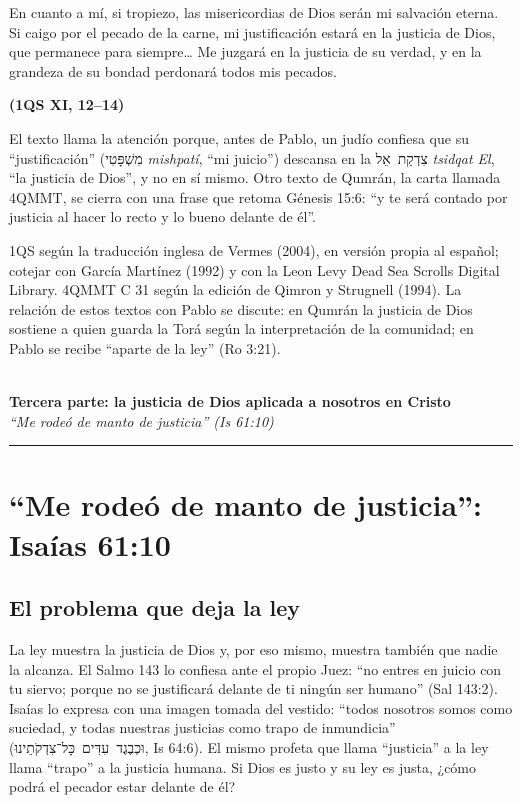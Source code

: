 \documentclass[11pt,letterpaper]{article}
\newcommand{\heb}[1]{\mbox{\foreignlanguage{hebrew}{#1}}}
\newcommand{\fuente}[1]{\par\hfill{\upshape\bfseries\small\textcolor{azul}{#1}}}
\begin{document}
\begin{cita}En cuanto a mí, si tropiezo, las misericordias de Dios serán mi salvación eterna. Si caigo por el pecado de la carne, mi justificación estará en la justicia de Dios, que permanece para siempre\ldots{} Me juzgará en la justicia de su verdad, y en la grandeza de su bondad perdonará todos mis pecados.\fuente{(1QS XI, 12--14)}\end{cita}

El texto llama la atención porque, antes de Pablo, un judío confiesa que su ``justificación'' (\heb{מִשְׁפָּטִי} \emph{mishpatí}, ``mi juicio'') descansa en la \heb{צִדְקַת אֵל} \emph{tsidqat El}, ``la justicia de Dios'', y no en sí mismo. Otro texto de Qumrán, la carta llamada 4QMMT, se cierra con una frase que retoma Génesis 15:6: ``y te será contado por justicia al hacer lo recto y lo bueno delante de él''.

\begin{nota}[Precisión]
1QS según la traducción inglesa de Vermes (2004), en versión propia al español; cotejar con García Martínez (1992) y con la Leon Levy Dead Sea Scrolls Digital Library. 4QMMT C 31 según la edición de Qimron y Strugnell (1994). La relación de estos textos con Pablo se discute: en Qumrán la justicia de Dios sostiene a quien guarda la Torá según la interpretación de la comunidad; en Pablo se recibe ``aparte de la ley'' (Ro 3:21).
\end{nota}


\begin{center}\vspace{6pt}{\color{dorado}\rule{0.6\linewidth}{1.2pt}}\\[6pt]
{\Large\bfseries\color{azul}Tercera parte: la justicia de Dios aplicada a nosotros en Cristo}\\[3pt]
{\small\itshape\color{gris}``Me rodeó de manto de justicia'' (Is 61:10)}\\[2pt]
{\color{dorado}\rule{0.6\linewidth}{1.2pt}}\vspace{4pt}\end{center}
\section{``Me rodeó de manto de justicia'': Isaías 61:10}\label{sec:manto-justo}

\subsection{El problema que deja la ley}
La ley muestra la justicia de Dios y, por eso mismo, muestra también que nadie la alcanza. El Salmo 143 lo confiesa ante el propio Juez: ``no entres en juicio con tu siervo; porque no se justificará delante de ti ningún ser humano'' (Sal 143:2). Isaías lo expresa con una imagen tomada del vestido: ``todos nosotros somos como suciedad, y todas nuestras justicias como trapo de inmundicia'' (\heb{וּכְבֶגֶד עִדִּים כָּל־צִדְקֹתֵינוּ}, Is 64:6). El mismo profeta que llama ``justicia'' a la ley llama ``trapo'' a la justicia humana. Si Dios es justo y su ley es justa, ¿cómo podrá el pecador estar delante de él?
\end{document}
